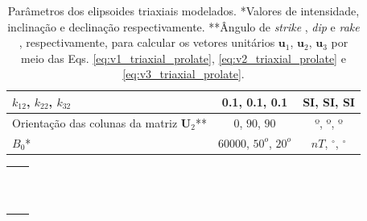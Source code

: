 \begin{table}[h!]
\begin{center}
\begin{tabular}{|l|c|c|}
			\hline
			$k_12$, $k_22$, $k_32$   & 0.1, 0.1, 0.1  & SI, SI, SI\\
			\hline
			Orientação das colunas da matriz $\mathbf{U}_2$**   & $0$, $90$, $90$  & º, º, º\\
			\hline
			$B_0$*    & 60000, $50^o$, $20^o$ & $nT$, $^{\circ}$, $^{\circ}$\\
			\hline			
		\end{tabular}
		\caption{Parâmetros dos elipsoides triaxiais modelados. *Valores de intensidade, inclinação e declinação respectivamente. **Ângulo de \textit{strike} , \textit{dip}  e \textit{rake} , respectivamente, para calcular os vetores unitários $\mathbf{u}_{1}$, $\mathbf{u}_{2}$, $\mathbf{u}_{3}$ por meio das Eqs. \ref{eq:v1_triaxial_prolate}, \ref{eq:v2_triaxial_prolate} e \ref{eq:v3_triaxial_prolate}.}
	\end{center}
	\label{tab:ellipsoid_triaxial_multi}
\end{table}

\begin{table}[h!]
	\begin{center}
		\begin{tabular}{lc}
			
			&  \\
			& \\
			& \\
			& \\
			& \\
			& \\ 
			& \\
			& \\
				& \\
				& \\ 
				& \\
		\end{tabular}
	\end{center}
\end{table}

